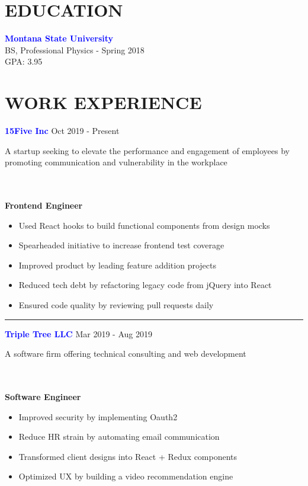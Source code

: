 \documentclass[12pt]{resume}
\begin{document}
    \begin{minipage}[t]{0.6\textwidth}
        {\section* {EDUCATION}}
        {\bf \textcolor{blue}{Montana State University}} \\
        BS, Professional Physics - Spring 2018\\
        GPA: 3.95
        \vspace{1em}
        {\section* {WORK EXPERIENCE}}
        \vspace{.5em}
        {\bf \textcolor{blue}{15Five Inc}} {\hfill Oct 2019 - Present}
        { \par A startup seeking to elevate the performance and engagement of employees by promoting communication and vulnerability in the workplace}\\\\
        {\bf Frontend Engineer}
        \vspace{.8em}
        \begin{itemize}
            \setlength\itemsep{-.2em}
            \item {Used React hooks to build functional components from design mocks}
            \item {Spearheaded initiative to increase frontend test coverage}
            \item {Improved product by leading feature addition projects}
            \item {Reduced tech debt by refactoring legacy code from jQuery into React}
            \item {Ensured code quality by reviewing pull requests daily}
        \end{itemize}

        \vspace{-.5em}
        \rule{\textwidth}{0.1pt}
        \vspace{.1em}

        {\bf \textcolor{blue}{Triple Tree LLC}} {\hfill Mar 2019 - Aug 2019}
        { \par A software firm offering technical consulting and web development}\\\\
        {\bf Software Engineer}
        \begin{itemize}
            \setlength\itemsep{-.2em}
            \item {Improved security by implementing Oauth2}
            \item {Reduce HR strain by automating email communication}
            \item {Transformed client designs into React + Redux components}
            \item {Optimized UX by building a video recommendation engine}
        \end{itemize}


\end{minipage}
\end{document}
